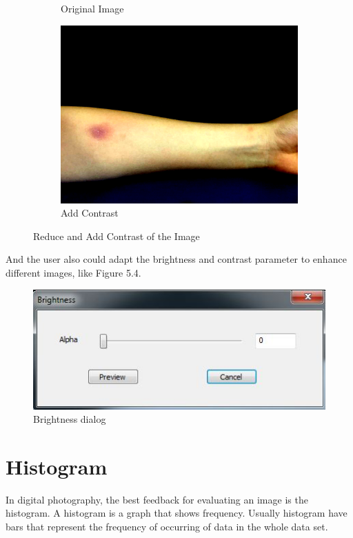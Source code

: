 \begin{figure}[!h]
\begin{subfigure}{.3\textwidth}
  \caption{Original Image}
  \label{fig:sub2}
\end{subfigure}
\begin{subfigure}{.3\textwidth}
  \centering
  \includegraphics[scale=0.14]{img/contrast2}
  \caption{Add Contrast}
  \label{fig:sub2}
\end{subfigure}
\caption{Reduce and Add Contrast of the Image}
\label{fig:test}
\end{figure}

And the user also could adapt the brightness and contrast parameter to enhance different images, like Figure 5.4.
\begin{figure}[!htb]
	\centering
	\includegraphics[scale=1]{img/brightdialog2}
	\caption{Brightness dialog}
\end{figure}
\section{Histogram}
In digital photography, the best feedback for evaluating an image is the histogram. A histogram is a graph that shows frequency. Usually histogram have bars that represent the frequency of occurring of data in the whole data set.   

